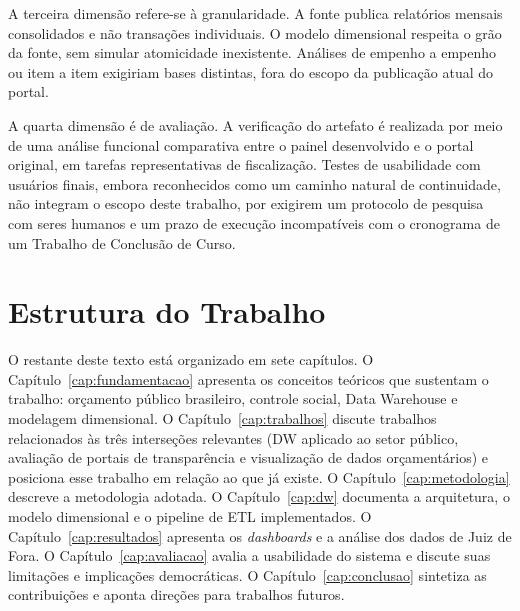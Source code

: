 A terceira dimensão refere-se à granularidade. A fonte publica relatórios mensais consolidados e não transações individuais. O modelo dimensional respeita o grão da fonte, sem simular atomicidade inexistente. Análises de empenho a empenho ou item a item exigiriam bases distintas, fora do escopo da publicação atual do portal.

A quarta dimensão é de avaliação. A verificação do artefato é realizada por meio de uma análise funcional comparativa entre o painel desenvolvido e o portal original, em tarefas representativas de fiscalização. Testes de usabilidade com usuários finais, embora reconhecidos como um caminho natural de continuidade, não integram o escopo deste trabalho, por exigirem um protocolo de pesquisa com seres humanos e um prazo de execução incompatíveis com o cronograma de um Trabalho de Conclusão de Curso.

\section{Estrutura do Trabalho}

O restante deste texto está organizado em sete capítulos. O Capítulo~\ref{cap:fundamentacao} apresenta os conceitos teóricos que sustentam o trabalho: orçamento público brasileiro, controle social, Data Warehouse e modelagem dimensional. O Capítulo~\ref{cap:trabalhos} discute trabalhos relacionados às três interseções relevantes (DW aplicado ao setor público, avaliação de portais de transparência e visualização de dados orçamentários) e posiciona esse trabalho em relação ao que já existe. O Capítulo~\ref{cap:metodologia} descreve a metodologia adotada. O Capítulo~\ref{cap:dw} documenta a arquitetura, o modelo dimensional e o pipeline de ETL implementados. O Capítulo~\ref{cap:resultados} apresenta os \textit{dashboards} e a análise dos dados de Juiz de Fora. O Capítulo~\ref{cap:avaliacao} avalia a usabilidade do sistema e discute suas limitações e implicações democráticas. O Capítulo~\ref{cap:conclusao} sintetiza as contribuições e aponta direções para trabalhos futuros.

